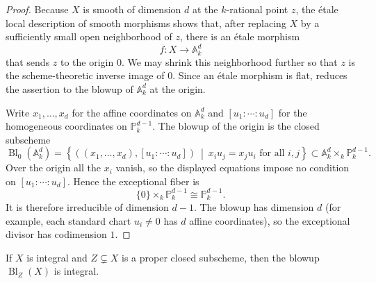 \begin{proof}
Because $X$ is smooth of dimension $d$ at the $k$-rational point $z$, the
étale local description of smooth morphisms  shows that,
after replacing $X$ by a sufficiently small open neighborhood of $z$, there
is an étale morphism
\[
f:X\longrightarrow \mathbb A_k^d
\]
that sends $z$ to the origin $0$. We may shrink this neighborhood further so
that $z$ is the scheme-theoretic inverse image of $0$. Since an étale
morphism is flat,  reduces the assertion
to the blowup of $\mathbb A_k^d$ at the origin.

Write $x_1,\ldots,x_d$ for the affine coordinates on $\mathbb A_k^d$ and
$[u_1:\cdots:u_d]$ for the homogeneous coordinates on
$\mathbb P_k^{d-1}$. The blowup of the origin is the closed subscheme
\[
\operatorname{Bl}_0(\mathbb A_k^d)
=
\left\{
((x_1,\ldots,x_d),[u_1:\cdots:u_d])
\ \middle|\
x_i u_j=x_j u_i\text{ for all }i,j
\right\}
\subset \mathbb A_k^d\times_k\mathbb P_k^{d-1}.
\]
Over the origin all the $x_i$ vanish, so the displayed equations impose no
condition on $[u_1:\cdots:u_d]$. Hence the exceptional fiber is
\[
\{0\}\times_k\mathbb P_k^{d-1}\cong\mathbb P_k^{d-1}.
\]
It is therefore irreducible of dimension $d-1$. The blowup has dimension
$d$ (for example, each standard chart $u_i\neq0$ has $d$ affine
coordinates), so the exceptional divisor has codimension $1$.
\end{proof}

\begin{theorem}[\stackstag{02ND}]\label{theorem:blowup_integral}
If $X$ is integral and $Z\subsetneq X$ is a proper closed subscheme, then the
blowup $\operatorname{Bl}_Z(X)$ is integral.
\end{theorem}
